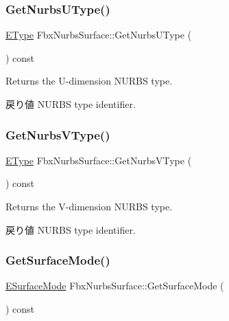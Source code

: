 \subsubsection{\texorpdfstring{Get\+Nurbs\+U\+Type()}{GetNurbsUType()}}
{\footnotesize\ttfamily \hyperlink{class_fbx_nurbs_surface_a87c1fcd98d8fa511ee6c6166346a46b3}{E\+Type} Fbx\+Nurbs\+Surface\+::\+Get\+Nurbs\+U\+Type (\begin{DoxyParamCaption}{ }\end{DoxyParamCaption}) const}

Returns the U-\/dimension N\+U\+R\+BS type. \begin{DoxyReturn}{戻り値}
N\+U\+R\+BS type identifier. 
\end{DoxyReturn}
\mbox{\label{class_fbx_nurbs_surface_a8e1f509e97a93380853aa0a009aa7a01}} 
\subsubsection{\texorpdfstring{Get\+Nurbs\+V\+Type()}{GetNurbsVType()}}
{\footnotesize\ttfamily \hyperlink{class_fbx_nurbs_surface_a87c1fcd98d8fa511ee6c6166346a46b3}{E\+Type} Fbx\+Nurbs\+Surface\+::\+Get\+Nurbs\+V\+Type (\begin{DoxyParamCaption}{ }\end{DoxyParamCaption}) const}

Returns the V-\/dimension N\+U\+R\+BS type. \begin{DoxyReturn}{戻り値}
N\+U\+R\+BS type identifier. 
\end{DoxyReturn}
\mbox{\label{class_fbx_nurbs_surface_a00e68c448d8dc33a1f2a7f4d8996331e}} 
\subsubsection{\texorpdfstring{Get\+Surface\+Mode()}{GetSurfaceMode()}}
{\footnotesize\ttfamily \hyperlink{class_fbx_geometry_adb9d2e34481a2cb40f1d783c665794db}{E\+Surface\+Mode} Fbx\+Nurbs\+Surface\+::\+Get\+Surface\+Mode (\begin{DoxyParamCaption}{ }\end{DoxyParamCaption}) const}

